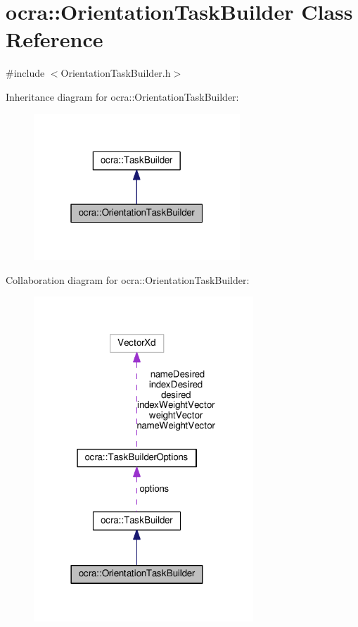 \hypertarget{classocra_1_1OrientationTaskBuilder}{}\section{ocra\+:\+:Orientation\+Task\+Builder Class Reference}
\label{classocra_1_1OrientationTaskBuilder}


{\ttfamily \#include $<$Orientation\+Task\+Builder.\+h$>$}



Inheritance diagram for ocra\+:\+:Orientation\+Task\+Builder\+:
\nopagebreak
\begin{figure}[H]
\begin{center}
\leavevmode
\includegraphics[width=220pt]{de/d80/classocra_1_1OrientationTaskBuilder__inherit__graph}
\end{center}
\end{figure}


Collaboration diagram for ocra\+:\+:Orientation\+Task\+Builder\+:
\nopagebreak
\begin{figure}[H]
\begin{center}
\leavevmode
\includegraphics[width=234pt]{d8/d6e/classocra_1_1OrientationTaskBuilder__coll__graph}
\end{center}
\end{figure}
